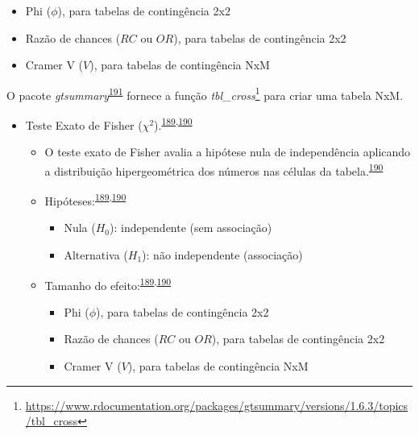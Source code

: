 \documentclass[
  a4paper,
]{book}
\renewcommand{\href}[2]{#2\footnote{\url{#1}}}
\newenvironment{infobox}[1]
  {
  \begin{itemize}
  \renewcommand{\labelitemi}{
    \raisebox{-.7\height}[0pt][0pt]{
      {\setkeys{Gin}{width=3em,keepaspectratio}
        \texttt{[image: \#1]}}
    }
  }
  \setlength{\fboxsep}{1em}
  \begin{blackbox}
  \item
  }
  {
  \end{blackbox}
  \end{itemize}
  }
\begin{document}
\begin{itemize}
\begin{itemize}
    \begin{itemize}
    \item
      Phi (\(\phi\)), para tabelas de contingência 2x2
    \item
      Razão de chances (\(RC\) ou \(OR\)), para tabelas de contingência 2x2
    \item
      Cramer V (\(V\)), para tabelas de contingência NxM
    \end{itemize}
  \end{itemize}
\end{itemize}

\begin{infobox}{images/Rlogo}
O pacote \emph{gtsummary}\textsuperscript{\protect\hyperlink{ref-gtsummary}{191}} fornece a função \href{https://www.rdocumentation.org/packages/gtsummary/versions/1.6.3/topics/tbl_cross}{\emph{tbl\_cross}} para criar uma tabela NxM.

\end{infobox}

\begin{itemize}
\item
  Teste Exato de Fisher (\(\chi^2\)).\textsuperscript{\protect\hyperlink{ref-McHugh2013}{189},\protect\hyperlink{ref-Kim2017a}{190}}

  \begin{itemize}
  \item
    O teste exato de Fisher avalia a hipótese nula de independência aplicando a distribuição hipergeométrica dos números nas células da tabela.\textsuperscript{\protect\hyperlink{ref-Kim2017a}{190}}
  \item
    Hipóteses:\textsuperscript{\protect\hyperlink{ref-McHugh2013}{189},\protect\hyperlink{ref-Kim2017a}{190}}

    \begin{itemize}
    \item
      Nula (\(H_{0}\)): independente (sem associação)
    \item
      Alternativa (\(H_{1}\)): não independente (associação)
    \end{itemize}
  \item
    Tamanho do efeito:\textsuperscript{\protect\hyperlink{ref-McHugh2013}{189},\protect\hyperlink{ref-Kim2017a}{190}}

    \begin{itemize}
    \item
      Phi (\(\phi\)), para tabelas de contingência 2x2
    \item
      Razão de chances (\(RC\) ou \(OR\)), para tabelas de contingência 2x2
    \item
      Cramer V (\(V\)), para tabelas de contingência NxM
    \end{itemize}
  \end{itemize}
\end{itemize}
\end{document}
